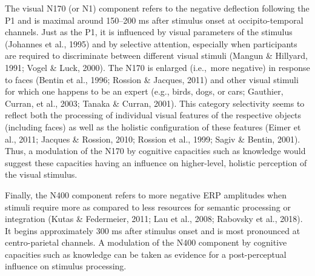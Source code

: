 \documentclass[
  english,
  doc,12pt,twoside,floatsintext]{apa7}
\begin{document}
The visual N170 (or N1) component refers to the negative deflection following the P1 and is maximal around 150--200 ms after stimulus onset at occipito-temporal channels. Just as the P1, it is influenced by visual parameters of the stimulus (Johannes et al., 1995) and by selective attention, especially when participants are required to discriminate between different visual stimuli (Mangun \& Hillyard, 1991; Vogel \& Luck, 2000). The N170 is enlarged (i.e.,~more negative) in response to faces (Bentin et al., 1996; Rossion \& Jacques, 2011) and other visual stimuli for which one happens to be an expert (e.g., birds, dogs, or cars; Gauthier, Curran, et al., 2003; Tanaka \& Curran, 2001). This category selectivity seems to reflect both the processing of individual visual features of the respective objects (including faces) as well as the holistic configuration of these features (Eimer et al., 2011; Jacques \& Rossion, 2010; Rossion et al., 1999; Sagiv \& Bentin, 2001). Thus, a modulation of the N170 by cognitive capacities such as knowledge would suggest these capacities having an influence on higher-level, holistic perception of the visual stimulus.

Finally, the N400 component refers to more negative ERP amplitudes when stimuli require more as compared to less resources for semantic processing or integration (Kutas \& Federmeier, 2011; Lau et al., 2008; Rabovsky et al., 2018). It begins approximately 300 ms after stimulus onset and is most pronounced at centro-parietal channels. A modulation of the N400 component by cognitive capacities such as knowledge can be taken as evidence for a post-perceptual influence on stimulus processing.
\end{document}
